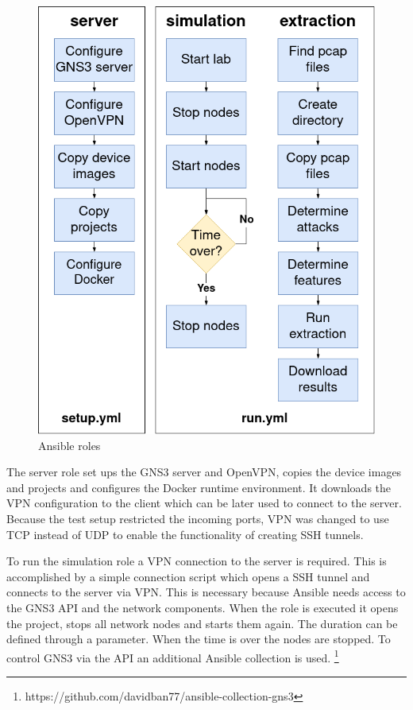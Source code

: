\documentclass[conference]{IEEEtran}
\begin{document}
\begin{figure}[htbp]
\centerline{\includegraphics[scale=0.33]{ansible.png}}
\caption{Ansible roles}
\label{ansible}
\end{figure}

The server role set ups the GNS3 server and OpenVPN, copies the device images and projects and configures the Docker runtime environment. It downloads the VPN configuration to the client which can be later used to connect to the server. Because the test setup restricted the incoming ports, VPN was changed to use TCP instead of UDP to enable the functionality of creating SSH tunnels.

To run the simulation role a VPN connection to the server is required. This is accomplished by a simple connection script which opens a SSH tunnel and connects to the server via VPN. This is necessary because Ansible needs access to the GNS3 API and the network components. When the role is executed it opens the project, stops all network nodes and starts them again. The duration can be defined through a parameter. When the time is over the nodes are stopped. To control GNS3 via the API an additional Ansible collection is used. \footnote{https://github.com/davidban77/ansible-collection-gns3}
\end{document}
